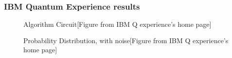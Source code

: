 \documentclass{article}
\begin{document}
\subsubsection{IBM Quantum Experience results}
\begin{figure}[H]
\centering 
\noindent{}%
\caption{Algorithm Circuit[Figure from IBM Q experience's home page]}
\end{figure}
\begin{figure}[H]
\centering 
\noindent{}%
\caption{Probability Distribution, with noise[Figure from IBM Q experience's home page]}
\end{figure}
\end{document}
